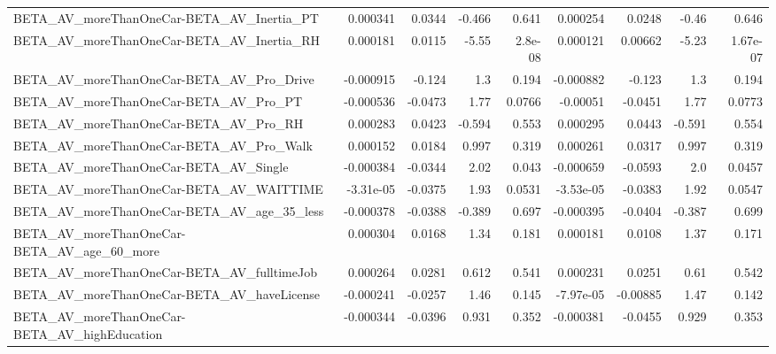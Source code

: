 \begin{tabular}{lrrrrrrrr}
BETA\_AV\_moreThanOneCar-BETA\_AV\_Inertia\_PT          &    0.000341 &       0.0344 &   -0.466 &    0.641 &   0.000254 &      0.0248 &        -0.46 &         0.646 \\
BETA\_AV\_moreThanOneCar-BETA\_AV\_Inertia\_RH          &    0.000181 &       0.0115 &    -5.55 &  2.8e-08 &   0.000121 &     0.00662 &        -5.23 &      1.67e-07 \\
BETA\_AV\_moreThanOneCar-BETA\_AV\_Pro\_Drive           &   -0.000915 &       -0.124 &      1.3 &    0.194 &  -0.000882 &      -0.123 &          1.3 &         0.194 \\
BETA\_AV\_moreThanOneCar-BETA\_AV\_Pro\_PT              &   -0.000536 &      -0.0473 &     1.77 &   0.0766 &   -0.00051 &     -0.0451 &         1.77 &        0.0773 \\
BETA\_AV\_moreThanOneCar-BETA\_AV\_Pro\_RH              &    0.000283 &       0.0423 &   -0.594 &    0.553 &   0.000295 &      0.0443 &       -0.591 &         0.554 \\
BETA\_AV\_moreThanOneCar-BETA\_AV\_Pro\_Walk            &    0.000152 &       0.0184 &    0.997 &    0.319 &   0.000261 &      0.0317 &        0.997 &         0.319 \\
BETA\_AV\_moreThanOneCar-BETA\_AV\_Single              &   -0.000384 &      -0.0344 &     2.02 &    0.043 &  -0.000659 &     -0.0593 &          2.0 &        0.0457 \\
BETA\_AV\_moreThanOneCar-BETA\_AV\_WAITTIME            &   -3.31e-05 &      -0.0375 &     1.93 &   0.0531 &  -3.53e-05 &     -0.0383 &         1.92 &        0.0547 \\
BETA\_AV\_moreThanOneCar-BETA\_AV\_age\_35\_less         &   -0.000378 &      -0.0388 &   -0.389 &    0.697 &  -0.000395 &     -0.0404 &       -0.387 &         0.699 \\
BETA\_AV\_moreThanOneCar-BETA\_AV\_age\_60\_more         &    0.000304 &       0.0168 &     1.34 &    0.181 &   0.000181 &      0.0108 &         1.37 &         0.171 \\
BETA\_AV\_moreThanOneCar-BETA\_AV\_fulltimeJob         &    0.000264 &       0.0281 &    0.612 &    0.541 &   0.000231 &      0.0251 &         0.61 &         0.542 \\
BETA\_AV\_moreThanOneCar-BETA\_AV\_haveLicense         &   -0.000241 &      -0.0257 &     1.46 &    0.145 &  -7.97e-05 &    -0.00885 &         1.47 &         0.142 \\
BETA\_AV\_moreThanOneCar-BETA\_AV\_highEducation       &   -0.000344 &      -0.0396 &    0.931 &    0.352 &  -0.000381 &     -0.0455 &        0.929 &         0.353 \\

\end{tabular}
